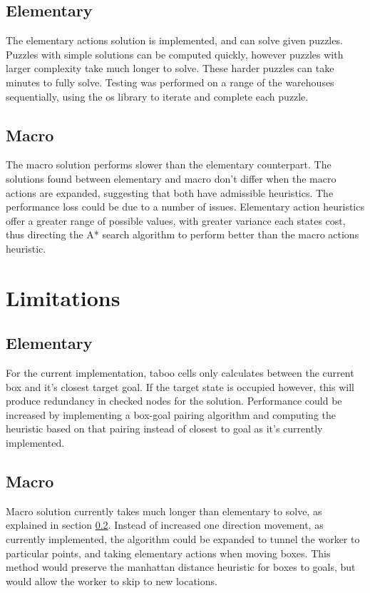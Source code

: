 \documentclass[]{article}
\begin{document}
\subsection{Elementary}
The elementary actions solution is implemented, and can solve given puzzles. Puzzles with simple solutions can be computed quickly, however puzzles with larger complexity take much longer to solve. These harder puzzles can take minutes to fully solve. Testing was performed on a range of the warehouses sequentially, using the os library to iterate and complete each puzzle. 
\subsection{Macro}
\label{Macro}
The macro solution performs slower than the elementary counterpart. The solutions found between elementary and macro don't differ when the macro actions are expanded, suggesting that both have admissible heuristics. The performance loss could be due to a number of issues. Elementary action heuristics offer a greater range of possible values, with greater variance each states cost, thus directing the A* search algorithm to perform better than the macro actions heuristic.
\section{Limitations}
\subsection{Elementary}
For the current implementation, taboo cells only calculates between the current box and it's closest target goal. If the target state is occupied however, this will produce redundancy in checked nodes for the solution. Performance could be increased by implementing a box-goal pairing algorithm and computing the heuristic based on that pairing instead of closest to goal as it's currently implemented.
\subsection{Macro}
Macro solution currently takes much longer than elementary to solve, as explained in section \ref{Macro}. Instead of increased one direction movement, as currently implemented, the algorithm could be expanded to tunnel the worker to particular points, and taking elementary actions when moving boxes. This method would preserve the manhattan distance heuristic for boxes to goals, but would allow the worker to skip to new locations. 
\end{document}
